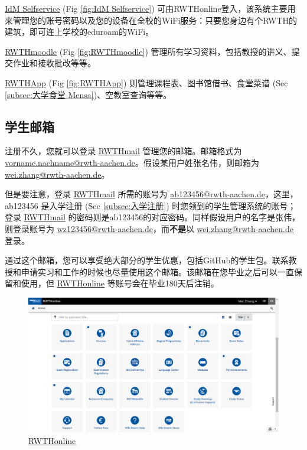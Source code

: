     \href{https://idm.rwth-aachen.de/selfservice}{IdM Selfservice} (Fig \ref{fig:IdM Selfservice}) 可由RWTHonline登入，该系统主要用来管理您的账号密码以及您的设备在全校的WiFi服务：只要您身边有个RWTH的建筑，即可连上学校的eduroam的WiFi。

    \href{https://moodle.rwth-aachen.de/}{RWTHmoodle} (Fig \ref{fig:RWTHmoodle}) 管理所有学习资料，包括教授的讲义、提交作业和接收批改等等。

    \href{https://play.google.com/store/apps/details?id=de.rwth_aachen.rz.rwthapp&hl=en}{RWTHApp} (Fig \ref{fig:RWTHApp}) 则管理课程表、图书馆借书、食堂菜谱 (Sec \ref{subsec:大学食堂 Mensa})、空教室查询等等。

  \subsection{学生邮箱}\label{subsec:学生邮箱}

    注册不久，您就可以登录 \href{https://mail.rwth-aachen.de/}{RWTHmail} 管理您的邮箱。邮箱格式为 \href{mailto:vorname.nachname@rwth-aachen.de}{vorname.nachname@rwth-aachen.de}。假设某用户姓张名伟，则邮箱为 \href{mailto:wei.zhang@rwth-aachen.de}{wei.zhang@rwth-aachen.de}。

    但是要注意，登录 \href{https://mail.rwth-aachen.de/}{RWTHmail} 所需的账号为 \href{mailto:ab123456@rwth-aachen.de}{ab123456@rwth-aachen.de}，这里，ab123456 是入学注册 (Sec \ref{subsec:入学注册}) 时您领到的学生管理系统的账号；登录 \href{https://mail.rwth-aachen.de/}{RWTHmail} 的密码则是ab123456的对应密码。同样假设用户的名字是张伟，则登录账号为 \href{mailto:wz123456@rwth-aachen.de}{wz123456@rwth-aachen.de}，而\textbf{不是}以 \href{mailto:wei.zhang@rwth-aachen.de}{wei.zhang@rwth-aachen.de} 登录。

    通过这个邮箱，您可以享受绝大部分的学生优惠，包括GitHub的学生包。联系教授和申请实习和工作的时候也尽量使用这个邮箱。该邮箱在您毕业之后可以一直保留和使用，但 \href{https://online.rwth-aachen.de/}{RWTHonline} 等账号会在毕业180天后注销。

    \begin{figure}[H]
      \centering
      \includegraphics[width=\textwidth]{初来乍到/Management_System/RWTHonline.png}
      \caption{\href{https://online.rwth-aachen.de/}{RWTHonline}}
      \label{fig:RWTHonline}
    \end{figure}

